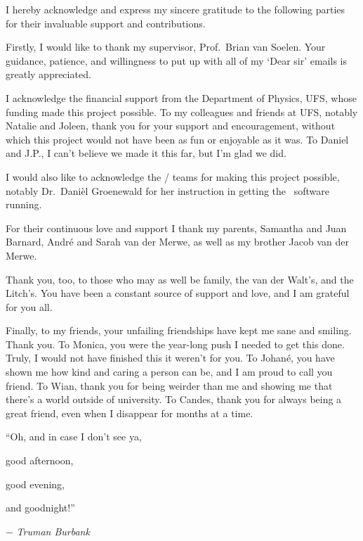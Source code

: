 \begin{acknowledgements}

    \baselineskip

    I hereby acknowledge and express my sincere gratitude to the following parties for their invaluable support and contributions.

    Firstly, I would like to thank my supervisor, Prof.~Brian van Soelen.
    Your guidance, patience, and willingness to put up with all of my `Dear sir' emails is greatly appreciated.

    I acknowledge the financial support from the Department of Physics, UFS, whose funding made this project possible.
    To my colleagues and friends at UFS, notably Natalie and Joleen, thank you for your support and encouragement, without which this project would not have been as fun or enjoyable as it was.
    To Daniel and J.P., I can't believe we made it this far, but I'm glad we did.
    
    I would also like to acknowledge the / teams for making this project possible, notably Dr.~Dani\`el Groenewald for her instruction in getting the \polsalt\ software running.
    
    
    For their continuous love and support I thank my parents, Samantha and Juan Barnard, Andr\'e and Sarah van der Merwe, as well as my brother Jacob van der Merwe.

    Thank you, too, to those who may as well be family, the van der Walt's, and the Litch's.
    You have been a constant source of support and love, and I am grateful for you all.
    
    Finally, to my friends, your unfailing friendships have kept me sane and smiling.
    Thank you.
    To Monica, you were the year-long push I needed to get this done.
    Truly, I would not have finished this it weren't for you.
    To Johan\'e, you have shown me how kind and caring a person can be, and I am proud to call you friend.
    To Wian, thank you for being weirder than me and showing me that there's a world outside of university.
    To Candes, thank you for always being a great friend, even when I disappear for months at a time.

    
    \begin{flushright} \baselineskip

        ``Oh, and in case I don't see ya,

        good afternoon,

        good evening,

        and goodnight!''\!\!\!

        \vspace{\baselineskip}
        
        $-$ \textit{Truman Burbank}

    \end{flushright}

\end{acknowledgements}
